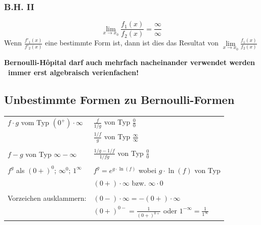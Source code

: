 \subsubsection{B.H. II}	
$$ \lim_{x \to x_0} \frac{f_1(x)}{f_2(x)} = \frac{\infty}{\infty}$$
Wenn $\frac{f'_1(x)}{f'_2(x)}$ eine bestimmte Form ist, dann ist dies das Resultat von 
$\lim \limits_{x \to x_0} \frac{f_1(x)}{f_2(x)}$

\vspace{0.5cm}
\textbf{Bernoulli-Hôpital darf auch mehrfach nacheinander verwendet werden}
\textbf{\textrightarrow\ immer erst algebraisch verienfachen!} 


\subsection{Unbestimmte Formen zu Bernoulli-Formen}		

\renewcommand{\arraystretch}{1.5}
\begin{tabular}{ll}
    $f \cdot g$ vom Typ $(0^+) \cdot \infty$        & $\frac{f}{1 / g}$ von Typ $\frac{0}{0}$ \\
                                                    & $\frac{1 / f}{g}$ von Typ $\frac{\infty}{\infty}$ \\
    \\
    $f - g$ von Typ $\infty - \infty$               & $\frac{1/g - 1/f}{1/ fg}$ von Typ $\frac{0}{0}$   \\
    \\
    $f^g$ als $(0+)^0$; $\infty^0$; $1^{\infty}$    & $f^g = e^{g \cdot \ln(f)}$ wobei $g \cdot \ln(f)$ von Typ \\
                                                    & $(0+) \cdot \infty$ bzw. $ \infty \cdot 0$ \\
    \\
    Vorzeichen ausklammern:                         & $(0-) \cdot \infty = -(0+) \cdot \infty$ \\
                                                    & $(0+)^{0-} = \frac{1}{(0+)^{0+}}$ oder $1^{-\infty} = \frac{1}{1^{\infty}}$
\end{tabular}


